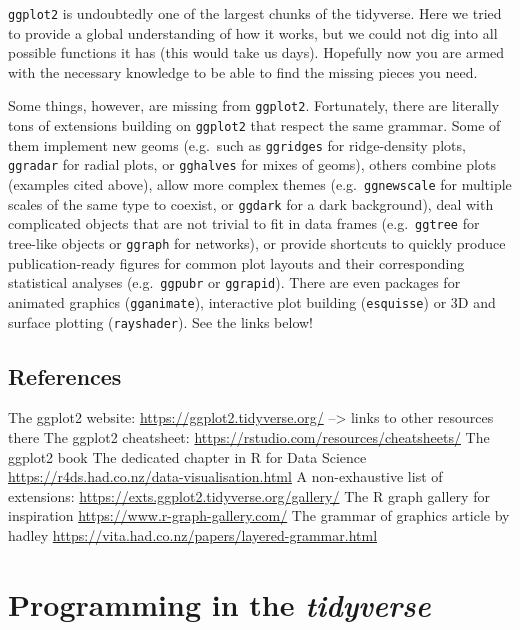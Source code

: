 \documentclass[]{book}
\begin{document}
\texttt{ggplot2} is undoubtedly one of the largest chunks of the tidyverse. Here we tried to provide a global understanding of how it works, but we could not dig into all possible functions it has (this would take us days). Hopefully now you are armed with the necessary knowledge to be able to find the missing pieces you need.

Some things, however, are missing from \texttt{ggplot2}. Fortunately, there are literally tons of extensions building on \texttt{ggplot2} that respect the same grammar. Some of them implement new geoms (e.g.~such as \texttt{ggridges} for ridge-density plots, \texttt{ggradar} for radial plots, or \texttt{gghalves} for mixes of geoms), others combine plots (examples cited above), allow more complex themes (e.g.~\texttt{ggnewscale} for multiple scales of the same type to coexist, or \texttt{ggdark} for a dark background), deal with complicated objects that are not trivial to fit in data frames (e.g.~\texttt{ggtree} for tree-like objects or \texttt{ggraph} for networks), or provide shortcuts to quickly produce publication-ready figures for common plot layouts and their corresponding statistical analyses (e.g.~\texttt{ggpubr} or \texttt{ggrapid}). There are even packages for animated graphics (\texttt{gganimate}), interactive plot building (\texttt{esquisse}) or 3D and surface plotting (\texttt{rayshader}). See the links below!

\hypertarget{references}{%
\section{References}\label{references}}

The ggplot2 website: \url{https://ggplot2.tidyverse.org/} --\textgreater{} links to other resources there
The ggplot2 cheatsheet: \url{https://rstudio.com/resources/cheatsheets/}
The ggplot2 book
The dedicated chapter in R for Data Science \url{https://r4ds.had.co.nz/data-visualisation.html}
A non-exhaustive list of extensions: \url{https://exts.ggplot2.tidyverse.org/gallery/}
The R graph gallery for inspiration \url{https://www.r-graph-gallery.com/}
The grammar of graphics article by hadley \url{https://vita.had.co.nz/papers/layered-grammar.html}

\hypertarget{programming-in-the-tidyverse}{%
\chapter{\texorpdfstring{Programming in the \emph{tidyverse}}{Programming in the tidyverse}}\label{programming-in-the-tidyverse}}
\end{document}
